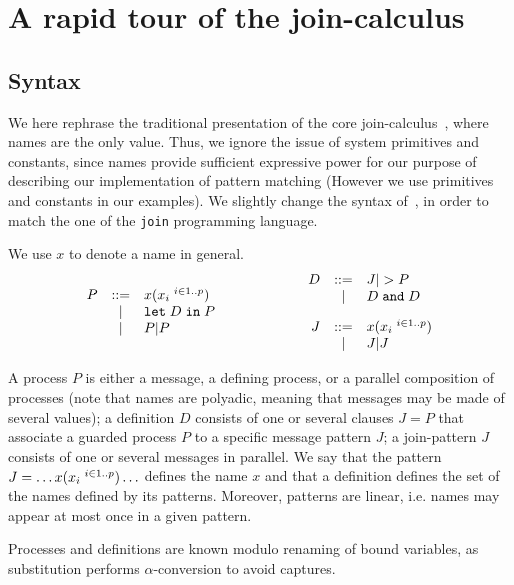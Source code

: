 \section{A rapid tour of the join-calculus}
\label{join-calculus}
\subsection {Syntax}

We here rephrase the traditional presentation of the core
join-calculus~\cite{FournetGonthier96}, where names are
the only value. Thus, we ignore the issue of system primitives and
constants, since
names provide sufficient expressive power for our purpose of
describing our implementation of pattern matching (However we use
primitives and constants in our examples).
We slightly change the syntax of~\cite{FournetGonthier96}, in order to
match the one of
the {\tt join} programming language.

We use $x$ to denote a name in general.
$$
\begin{array}{l@{\hspace{2cm}}l}
\begin{array}{rcl}
P & ::= & x\tuple{x_i\inu p}\\
  & \mid & \Def D in P\\
  & \mid & P | P
\end{array}
&
\begin{array}{rcl}
D & ::= & J |> P \\
  & \mid & D \And D\\[1em]

J & ::= &  x\tuple {x_i\inu p}\\
  & \mid & J | J
\end{array}
\end{array}
$$

A process $P$ is either a message, a defining process, or a parallel
composition of processes (note that names are polyadic, meaning that
messages may be made of several values);
%
a definition $D$ consists of one or several clauses $J = P$ that
associate a guarded process $P$ to a specific message pattern $J$;
%
a join-pattern $J$ consists of one or several messages in parallel. We
say that the pattern $J = \ldots x{\tt (}x_i \;{}^{i \in 1..p}{\tt )}\ldots$
defines the name $x$ and that a definition defines the set of the names
defined by its patterns.
Moreover, patterns are linear, i.e. names may appear at most once in
a given pattern.

Processes and definitions are known modulo renaming of bound
variables, as substitution performs $\alpha$-conversion to avoid
captures.

